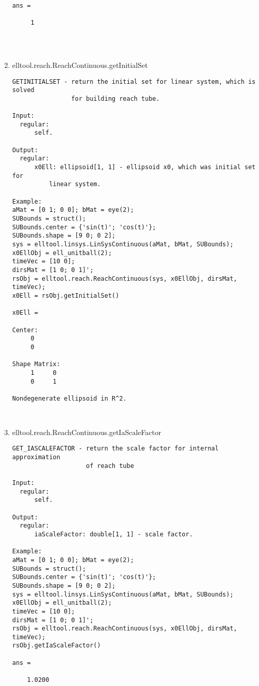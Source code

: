 \begin{enumerate}
\begin{lstlisting}
ans =

     1




\end{lstlisting}
\fontfamily{\familydefault}
\selectfont
\item {elltool.reach.ReachContinuous.getInitialSet}
\selectfont
\begin{lstlisting}
GETINITIALSET - return the initial set for linear system, which is solved
                for building reach tube.

Input:
  regular:
      self.

Output:
  regular:
      x0Ell: ellipsoid[1, 1] - ellipsoid x0, which was initial set for
          linear system.

Example:
aMat = [0 1; 0 0]; bMat = eye(2);
SUBounds = struct();
SUBounds.center = {'sin(t)'; 'cos(t)'};
SUBounds.shape = [9 0; 0 2];
sys = elltool.linsys.LinSysContinuous(aMat, bMat, SUBounds);
x0EllObj = ell_unitball(2);
timeVec = [10 0];
dirsMat = [1 0; 0 1]';
rsObj = elltool.reach.ReachContinuous(sys, x0EllObj, dirsMat, timeVec);
x0Ell = rsObj.getInitialSet()

x0Ell =

Center:
     0
     0

Shape Matrix:
     1     0
     0     1

Nondegenerate ellipsoid in R^2.



\end{lstlisting}
\fontfamily{\familydefault}
\selectfont
\item {elltool.reach.ReachContinuous.getIaScaleFactor}
\selectfont
\begin{lstlisting}
GET_IASCALEFACTOR - return the scale factor for internal approximation
                    of reach tube

Input:
  regular:
      self.

Output:
  regular:
      iaScaleFactor: double[1, 1] - scale factor.

Example:
aMat = [0 1; 0 0]; bMat = eye(2);
SUBounds = struct();
SUBounds.center = {'sin(t)'; 'cos(t)'};
SUBounds.shape = [9 0; 0 2];
sys = elltool.linsys.LinSysContinuous(aMat, bMat, SUBounds);
x0EllObj = ell_unitball(2);
timeVec = [10 0];
dirsMat = [1 0; 0 1]';
rsObj = elltool.reach.ReachContinuous(sys, x0EllObj, dirsMat, timeVec);
rsObj.getIaScaleFactor()

ans =

    1.0200




\end{lstlisting}
\end{enumerate}
